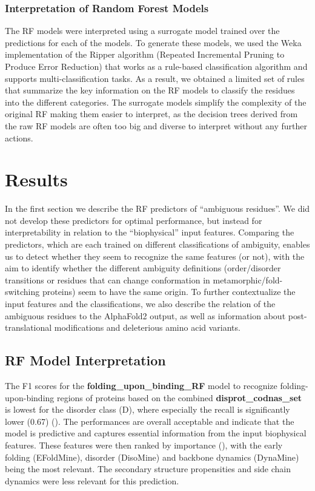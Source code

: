 \subsubsection{Interpretation of Random Forest Models}

The RF models were interpreted using a surrogate model trained over the predictions for each of the models. To generate these models, we used the Weka \cite{Frank2016Weka} implementation of the Ripper algorithm \cite{cohen_fast_1995} (Repeated Incremental Pruning to Produce Error Reduction) that works as a rule-based classification algorithm and supports multi-classification tasks. As a result, we obtained a limited set of rules that summarize the key information on the RF models to classify the residues into the different categories. The surrogate models simplify the complexity of the original RF making them easier to interpret, as the decision trees derived from the raw RF models are often too big and diverse to interpret without any further actions.


\section{Results}
In the first section we describe the RF predictors of ``ambiguous residues''. We did not develop these predictors for optimal performance, but instead for interpretability in relation to the ``biophysical'' input features. Comparing the predictors, which are each trained on different classifications of ambiguity, enables us to detect whether they seem to recognize the same features (or not), with the aim to identify whether the different ambiguity definitions (order/disorder transitions or residues that can change conformation in metamorphic/fold-switching proteins) seem to have the same origin. To further contextualize the input features and the classifications, we also describe the relation of the ambiguous residues to the AlphaFold2 output, as well as information about post-translational modifications and deleterious amino acid variants.

\subsection{RF Model Interpretation}

The F1 scores for the \textbf{folding_upon_binding_RF} model to recognize folding-upon-binding regions of proteins based on the combined \textbf{disprot_codnas_set} is lowest for the disorder class (D), where especially the recall is significantly lower (0.67) (). The performances are overall acceptable and indicate that the model is predictive and captures essential information from the input biophysical features. These features were then ranked by importance (), with the early folding (EFoldMine), disorder (DisoMine) and backbone dynamics (DynaMine) being the most relevant. The secondary structure propensities and side chain dynamics were less relevant for this prediction. 

